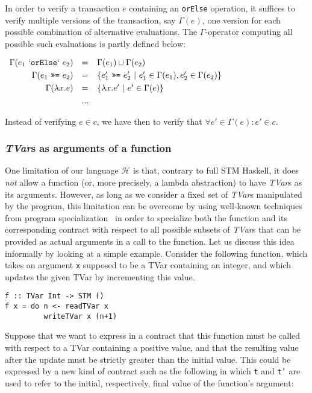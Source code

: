 \documentclass[submission,copyright,creativecommons]{eptcs}
\newcommand{\code}[1]{\textrm{{\tt #1}}}
\newcommand{\bindTM}{\ \ensuremath{\code{>>=}} \ }
\begin{document}
In order to verify a transaction $e$ containing an \texttt{orElse} operation, it suffices to verify multiple versions of the transaction, say $\Gamma(e)$, one version for each possible combination of alternative evaluations. The $\Gamma$-operator computing all possible such evaluations is partly defined below:
\smallskip

\begin{center}
\begin{math}
\begin{array}{rll}
\Gamma(e_1 \ \mathtt{`orElse`} \ e_2) & =&  \Gamma(e_1) \cup \Gamma(e_2) \smallskip \\
\Gamma(e_1 \bindTM e_2) &=& \{ e_1' \bindTM e_2' \ | \ e_1' \in \Gamma(e_1), e_2' \in \Gamma(e_2) \} \smallskip \\
\Gamma(\lambda x . e) & =&  \{ \lambda x . e' \ | \ e' \in \Gamma(e) \} \smallskip \\
& ... & \\
\end{array}
\end{math}
\end{center}
Instead of verifying $e \in c$, we have then to verify that $\forall e' \in \Gamma(e) : e' \in c$.

\subsubsection*{\emph{TVar}s as arguments of a function} 
One limitation of our language $\mathcal{H}$ is that, contrary to full STM Haskell, it does \emph{not} allow a function (or, more precisely, a lambda abstraction) to have \emph{TVar}s as its arguments.  
However, as long as we consider a fixed set of \emph{TVar}s manipulated by the program, this limitation can be overcome by using well-known techniques from program specialization~\cite{partial-evaluation-automatic,introduction-program-specialisation} in order to specialize both the function and its corresponding contract with respect to all possible subsets of \emph{TVar}s that can be provided as actual arguments in a call to the function.
Let us discuss this idea informally by looking at a simple example. Consider the following function, which takes an argument \texttt{x} supposed to be a TVar containing an integer, and which updates the given TVar by incrementing this value.

\begin{footnotesize}
\begin{verbatim}
f :: TVar Int -> STM ()
f x = do n <- readTVar x
         writeTVar x (n+1)
\end{verbatim}
\end{footnotesize}
Suppose that we want to express in a contract that this function must be called with respect to a TVar containing a positive value, and that the resulting value after the update must be strictly greater than the initial value. This could be expressed by a new kind of contract such as the following in which \texttt{t} and \texttt{t'} are used to refer to the initial, respectively, final value of the function's argument:
\end{document}
